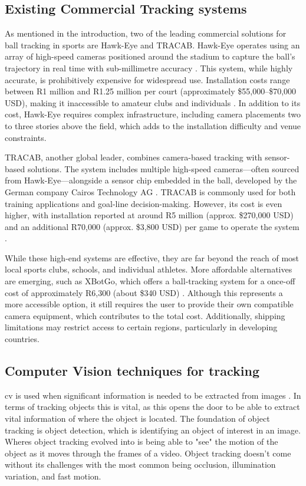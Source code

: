 \documentclass[12pt,a4paper]{article}
\begin{document}
\subsection{Existing Commercial Tracking systems}
As mentioned in the introduction, two of the leading commercial solutions for ball tracking in sports are Hawk-Eye and TRACAB. Hawk-Eye operates using an array of high-speed cameras positioned around the stadium to capture the ball's trajectory in real time with sub-millimetre accuracy \parencite{tennisnerd2024hawk-eye}. This system, while highly accurate, is prohibitively expensive for widespread use. Installation costs range between R1 million and R1.25 million per court (approximately \$55,000–\$70,000 USD), making it inaccessible to amateur clubs and individuals \parencite{wong2016lowcost}. In addition to its cost, Hawk-Eye requires complex infrastructure, including camera placements two to three stories above the field, which adds to the installation difficulty and venue constraints.

TRACAB, another global leader, combines camera-based tracking with sensor-based solutions. The system includes multiple high-speed cameras—often sourced from Hawk-Eye—alongside a sensor chip embedded in the ball, developed by the German company Cairos Technology AG \parencite{wipo2023goalline}. TRACAB is commonly used for both training applications and goal-line decision-making. However, its cost is even higher, with installation reported at around R5 million (approx. \$270,000 USD) and an additional R70,000 (approx. \$3,800 USD) per game to operate the system \parencite{wiebe2013mls}.

While these high-end systems are effective, they are far beyond the reach of most local sports clubs, schools, and individual athletes. More affordable alternatives are emerging, such as XBotGo, which offers a ball-tracking system for a once-off cost of approximately R6,300 (about \$340 USD) \parencite{xbotgo2024chameleon}. Although this represents a more accessible option, it still requires the user to provide their own compatible camera equipment, which contributes to the total cost. Additionally, shipping limitations may restrict access to certain regions, particularly in developing countries.

\subsection{Computer Vision techniques for tracking}
\acl{cv} is used when significant information is needed to be extracted from images \parencite{stockmanComputerVision}. In terms of tracking objects this is vital, as this opens the door to be able to extract vital information of where the object is located. The foundation of object tracking is object detection, which is identifying an object of interest in an image. Wheres object tracking evolved into is being able to "see" the motion of the object as it moves through the frames of a video\parencite{zhao2015overview}. Object tracking doesn't come without its challenges with the most common being occlusion, illumination variation, and fast motion\parencite{soleimanitaleb2019object}.
\end{document}
